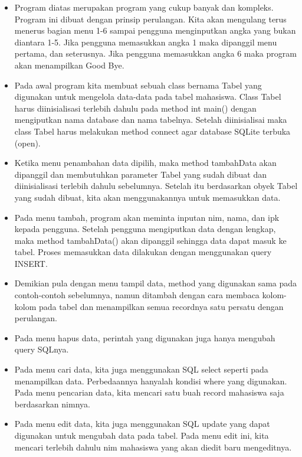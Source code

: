 \begin{itemize}
\item
  Program diatas merupakan program yang cukup banyak dan kompleks.
  Program ini dibuat dengan prinsip perulangan. Kita akan mengulang
  terus menerus bagian menu 1-6 sampai pengguna menginputkan angka yang
  bukan diantara 1-5. Jika pengguna memasukkan angka 1 maka dipanggil
  menu pertama, dan seterusnya. Jika pengguna memasukkan angka 6 maka
  program akan menampilkan Good Bye.
\item
  Pada awal program kita membuat sebuah class bernama Tabel yang
  digunakan untuk mengelola data-data pada tabel mahasiswa. Class Tabel
  harus diinisialisasi terlebih dahulu pada method int main() dengan
  mengiputkan nama database dan nama tabelnya. Setelah diinisialisai
  maka class Tabel harus melakukan method connect agar database SQLite
  terbuka (open).
\item
  Ketika menu penambahan data dipilih, maka method tambahData akan
  dipanggil dan membutuhkan parameter Tabel yang sudah dibuat dan
  diinisialisasi terlebih dahulu sebelumnya. Setelah itu berdasarkan
  obyek Tabel yang sudah dibuat, kita akan menggunakannya untuk
  memasukkan data.
\item
  Pada menu tambah, program akan meminta inputan nim, nama, dan ipk
  kepada pengguna. Setelah pengguna mengiputkan data dengan lengkap,
  maka method tambahData() akan dipanggil sehingga data dapat masuk ke
  tabel. Proses memasukkan data dilakukan dengan menggunakan query
  INSERT.
\item
  Demikian pula dengan menu tampil data, method yang digunakan sama pada
  contoh-contoh sebelumnya, namun ditambah dengan cara membaca
  kolom-kolom pada tabel dan menampilkan semua recordnya satu persatu
  dengan perulangan.
\item
  Pada menu hapus data, perintah yang digunakan juga hanya mengubah
  query SQLnya.
\item
  Pada menu cari data, kita juga menggunakan SQL select seperti pada
  menampilkan data. Perbedaannya hanyalah kondisi where yang digunakan.
  Pada menu pencarian data, kita mencari satu buah record mahasiswa saja
  berdasarkan nimnya.
\item
  Pada menu edit data, kita juga menggunakan SQL update yang dapat
  digunakan untuk mengubah data pada tabel. Pada menu edit ini, kita
  mencari terlebih dahulu nim mahasiswa yang akan diedit baru
  mengeditnya.
\end{itemize}

